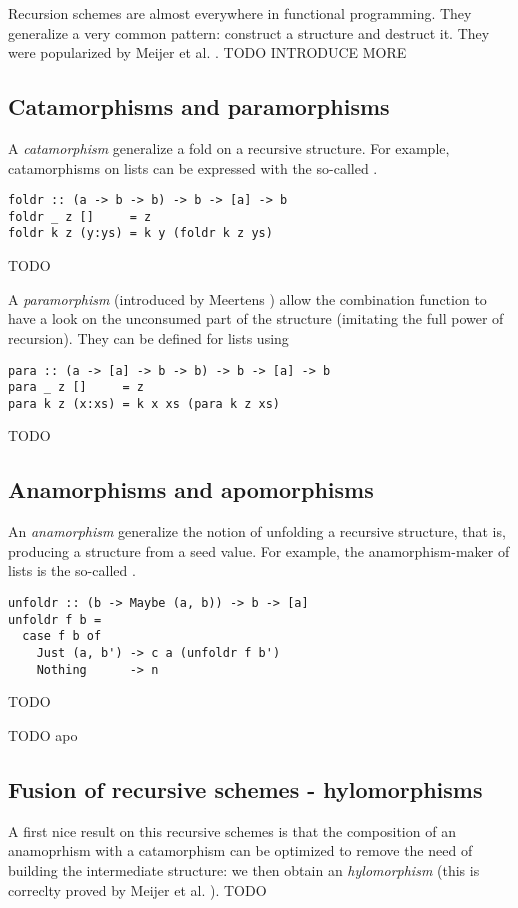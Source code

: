 
Recursion schemes are almost everywhere in functional programming. They generalize a very common pattern: construct a structure and destruct it. They were popularized by Meijer et al. \cite{4cec4a43c86444479dc0003182424795}. TODO INTRODUCE MORE

\subsection{Catamorphisms and paramorphisms}
A \emph{catamorphism} generalize a fold on a recursive structure. For example, catamorphisms on lists can be expressed with the so-called .
\begin{verbatim}
foldr :: (a -> b -> b) -> b -> [a] -> b
foldr _ z []     = z
foldr k z (y:ys) = k y (foldr k z ys)
\end{verbatim}
TODO

A \emph{paramorphism} (introduced by Meertens \cite{Meertens1992}) allow the combination function to have a look on the unconsumed part of the structure (imitating the full power of recursion). They can be defined for lists using 

\begin{verbatim}
para :: (a -> [a] -> b -> b) -> b -> [a] -> b
para _ z []     = z
para k z (x:xs) = k x xs (para k z xs)
\end{verbatim}

TODO
\subsection{Anamorphisms and apomorphisms}
An \emph{anamorphism} generalize the notion of unfolding a recursive structure, that is, producing a structure from a seed value.
For example, the anamorphism-maker of lists is the so-called .
\begin{verbatim}
unfoldr :: (b -> Maybe (a, b)) -> b -> [a]
unfoldr f b = 
  case f b of
    Just (a, b') -> c a (unfoldr f b')
    Nothing      -> n
\end{verbatim}
TODO

TODO apo
\subsection{Fusion of recursive schemes - hylomorphisms}
A first nice result on this recursive schemes is that the composition of an anamoprhism with a catamorphism can be optimized to remove the need of building the intermediate structure: we then obtain an \emph{hylomorphism} (this is correclty proved by Meijer et al. \cite{4cec4a43c86444479dc0003182424795}).
TODO

